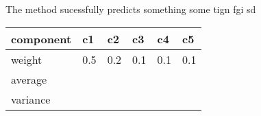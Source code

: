 The method sucessfully predicts something some tign fgi sd
\begin{table}[H]
\centering
\begin{tabular}{|l|l|l|l|l|l|} 
\hline
component & c1 & c2 & c3 & c4 & c5 \\ 
\hline
weight & 0.5 & 0.2 & 0.1 & 0.1 & 0.1 \\ 
\hline
average &  &  &  &  &   \\
\hline
variance &  &  &  &  &   \\
\hline
\end{tabular}
\end{table}
